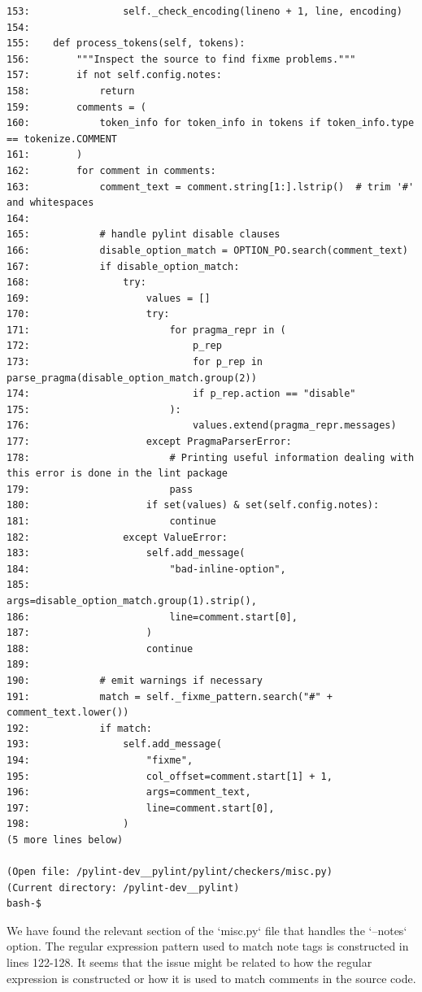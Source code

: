 {\begin{observationbox}
\begin{Verbatim}[breaklines=true, breakanywhere=true]
153:                self._check_encoding(lineno + 1, line, encoding)
154:
155:    def process_tokens(self, tokens):
156:        """Inspect the source to find fixme problems."""
157:        if not self.config.notes:
158:            return
159:        comments = (
160:            token_info for token_info in tokens if token_info.type == tokenize.COMMENT
161:        )
162:        for comment in comments:
163:            comment_text = comment.string[1:].lstrip()  # trim '#' and whitespaces
164:
165:            # handle pylint disable clauses
166:            disable_option_match = OPTION_PO.search(comment_text)
167:            if disable_option_match:
168:                try:
169:                    values = []
170:                    try:
171:                        for pragma_repr in (
172:                            p_rep
173:                            for p_rep in parse_pragma(disable_option_match.group(2))
174:                            if p_rep.action == "disable"
175:                        ):
176:                            values.extend(pragma_repr.messages)
177:                    except PragmaParserError:
178:                        # Printing useful information dealing with this error is done in the lint package
179:                        pass
180:                    if set(values) & set(self.config.notes):
181:                        continue
182:                except ValueError:
183:                    self.add_message(
184:                        "bad-inline-option",
185:                        args=disable_option_match.group(1).strip(),
186:                        line=comment.start[0],
187:                    )
188:                    continue
189:
190:            # emit warnings if necessary
191:            match = self._fixme_pattern.search("#" + comment_text.lower())
192:            if match:
193:                self.add_message(
194:                    "fixme",
195:                    col_offset=comment.start[1] + 1,
196:                    args=comment_text,
197:                    line=comment.start[0],
198:                )
(5 more lines below)

(Open file: /pylint-dev__pylint/pylint/checkers/misc.py)
(Current directory: /pylint-dev__pylint)
bash-$
\end{Verbatim}
\end{observationbox}
\begin{agentbox}
We have found the relevant section of the `misc.py` file that handles the `--notes` option. The regular expression pattern used to match note tags is constructed in lines 122-128. It seems that the issue might be related to how the regular expression is constructed or how it is used to match comments in the source code.




\end{agentbox}}
